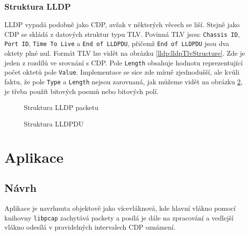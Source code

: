 \documentclass[a4paper,12pt]{article}
\begin{document}
			\subsubsection{Struktura LLDP}
				LLDP vypadá podobně jako CDP, avšak v některých věcech se liší. Stejně jako CDP se skládá z datových struktur typu TLV. Povinná TLV jsou: \texttt{Chassis ID}, \texttt{Port ID}, \texttt{Time To Live} a \texttt{End of LLDPDU}, přičemž \texttt{End of LLDPDU} jsou dva oktety plné nul. Formát TLV lze vidět na obrázku \ref{lldp:lldpTlvStructure}. Zde je jeden z rozdílů ve srovnání s CDP. Pole \texttt{Length} obsahuje hodnotu reprezentující počet oktetů pole \texttt{Value}. Implementace se sice zde mírně zjednodušší, ale kvůli faktu, že pole \texttt{Type} a \texttt{Length} nejsou zarovnaná, jak můžeme vidět na obrázku \ref{pic:lldpTlvStructure}, je třeba použít bitových posunů nebo bitových polí.
				
				\begin{figure}[h]	
					\begin{center}
						\caption{Struktura LLDP packetu}
						\label{pic:lldpStructure}
					\end{center}
				\end{figure}
				
				\begin{figure}[h]	
					\begin{center}
						\caption{Struktura LLDPDU}
						\label{pic:lldpTlvStructure}
					\end{center}
				\end{figure}
			
	\section{Aplikace}
	\subsection{Návrh}
		Aplikace je navrhnuta objektově jako vícevláknová, kde hlavní vlákno pomocí knihovny \texttt{libpcap} zachytává packety a posílá je dále na zpracování a vedlejší vlákno odesílá v pravidelných intervalech CDP oznámení.
	
\end{document}
